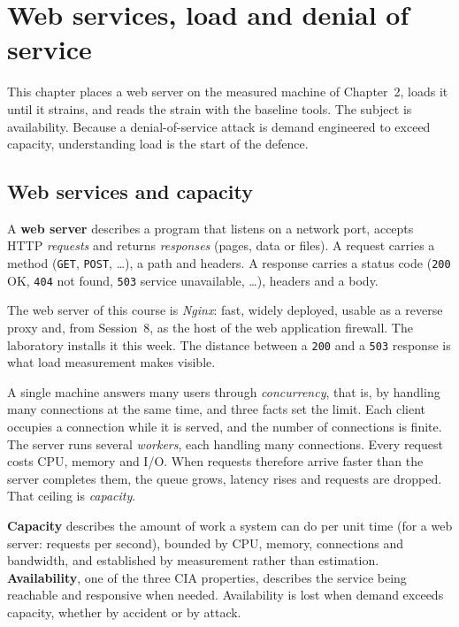 \chapter{Web services, load and denial of service}

This chapter places a web server on the measured machine of Chapter~2,
loads it until it strains, and reads the strain with the baseline tools. The
subject is availability. Because a denial-of-service attack is demand
engineered to exceed capacity, understanding load is the start of the
defence.

\section{Web services and capacity}

\begin{definition}\label{def:webserver}
A \textbf{web server} describes a program that listens on a network port,
accepts HTTP \emph{requests} and returns \emph{responses} (pages, data or
files). A request carries a method (\texttt{GET}, \texttt{POST}, \ldots), a
path and headers. A response carries a status code (\texttt{200} OK,
\texttt{404} not found, \texttt{503} service unavailable, \ldots), headers and
a body.
\end{definition}

The web server of this course is \emph{Nginx}: fast, widely deployed, usable
as a reverse proxy and, from Session~8, as the host of the web application
firewall. The laboratory installs it this week. The distance between a
\texttt{200} and a \texttt{503} response is what load measurement makes
visible.

A single machine answers many users through \emph{concurrency}, that is, by
handling many connections at the same time, and three facts set the limit.
Each client occupies a connection while it is served, and the number of
connections is finite. The server runs several \emph{workers}, each handling
many connections. Every request costs CPU, memory and I/O. When requests
therefore arrive faster than the server completes them, the queue grows,
latency rises and requests are dropped. That ceiling is \emph{capacity}.

\begin{definition}\label{def:capacity}
\textbf{Capacity} describes the amount of work a system can do per unit time
(for a web server: requests per second), bounded by CPU, memory, connections
and bandwidth, and established by measurement rather than estimation.
\textbf{Availability}, one of the three CIA properties, describes the service
being reachable and responsive when needed. Availability is lost when demand
exceeds capacity, whether by accident or by attack.
\end{definition}

